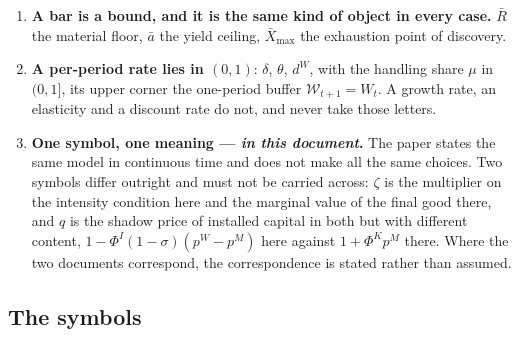 \begin{enumerate}
\item \textbf{A bar is a bound, and it is the same kind of object in every case.} $\bar R$ the material
floor, $\bar a$ the yield ceiling, $\bar X_{\max}$ the exhaustion point of discovery.

\item \textbf{A per-period rate lies in $(0,1)$}: $\delta$, $\theta$, $d^W$, with the handling share
$\mu$ in $(0,1]$, its upper corner the one-period buffer $\mathcal W_{t+1}=W_t$. A growth rate, an
elasticity and a discount rate do not, and never take those letters.

\item \textbf{One symbol, one meaning --- \emph{in this document}.} The paper states the same model in
continuous time and does not make all the same choices. Two symbols differ outright and must not be
carried across: $\zeta$ is the multiplier on the intensity condition here and the marginal value of the
final good there, and $q$ is the shadow price of installed capital in both but with different content,
$1-\Phi^I\left(1-\sigma\right)\left(p^W-p^M\right)$ here against $1+\Phi^Kp^M$ there. Where the two
documents correspond, the correspondence is stated rather than assumed.
\end{enumerate}

\subsection{The symbols}\label{sec:app:notation:table}

